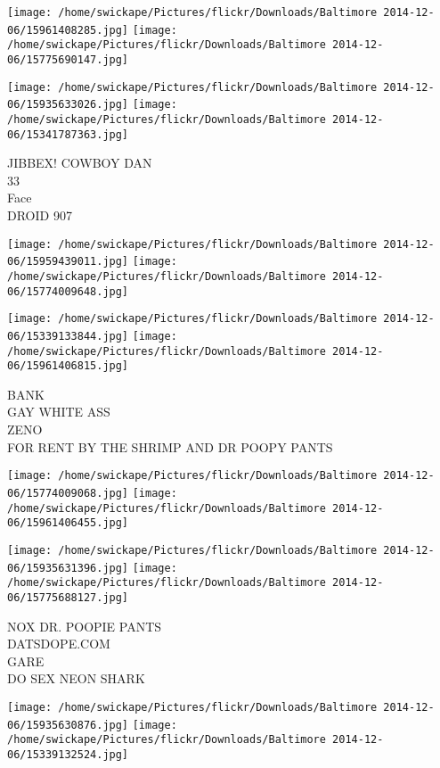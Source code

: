 \documentclass[10pt,letterpaper]{article}
\begin{document}
\texttt{[image: /home/swickape/Pictures/flickr/Downloads/Baltimore 2014-12-06/15961408285.jpg]}
\texttt{[image: /home/swickape/Pictures/flickr/Downloads/Baltimore 2014-12-06/15775690147.jpg]}

\texttt{[image: /home/swickape/Pictures/flickr/Downloads/Baltimore 2014-12-06/15935633026.jpg]}
\texttt{[image: /home/swickape/Pictures/flickr/Downloads/Baltimore 2014-12-06/15341787363.jpg]}

JIBBEX! COWBOY DAN\\
33\\
Face\\
DROID 907\\
\pagebreak

\texttt{[image: /home/swickape/Pictures/flickr/Downloads/Baltimore 2014-12-06/15959439011.jpg]}
\texttt{[image: /home/swickape/Pictures/flickr/Downloads/Baltimore 2014-12-06/15774009648.jpg]}

\texttt{[image: /home/swickape/Pictures/flickr/Downloads/Baltimore 2014-12-06/15339133844.jpg]}
\texttt{[image: /home/swickape/Pictures/flickr/Downloads/Baltimore 2014-12-06/15961406815.jpg]}

BANK\\
GAY WHITE ASS\\
ZENO\\
FOR RENT BY THE SHRIMP AND DR POOPY PANTS\\
\pagebreak

\texttt{[image: /home/swickape/Pictures/flickr/Downloads/Baltimore 2014-12-06/15774009068.jpg]}
\texttt{[image: /home/swickape/Pictures/flickr/Downloads/Baltimore 2014-12-06/15961406455.jpg]}

\texttt{[image: /home/swickape/Pictures/flickr/Downloads/Baltimore 2014-12-06/15935631396.jpg]}
\texttt{[image: /home/swickape/Pictures/flickr/Downloads/Baltimore 2014-12-06/15775688127.jpg]}

NOX DR. POOPIE PANTS\\
DATSDOPE.COM\\
GARE\\
DO SEX NEON SHARK\\
\pagebreak

\texttt{[image: /home/swickape/Pictures/flickr/Downloads/Baltimore 2014-12-06/15935630876.jpg]}
\texttt{[image: /home/swickape/Pictures/flickr/Downloads/Baltimore 2014-12-06/15339132524.jpg]}
\end{document}
